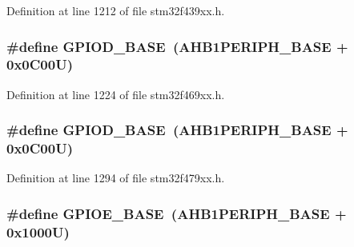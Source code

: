 Definition at line 1212 of file stm32f439xx.\+h.

\subsubsection[{\texorpdfstring{G\+P\+I\+O\+D\+\_\+\+B\+A\+SE}{GPIOD_BASE}}]{\setlength{\rightskip}{0pt plus 5cm}\#define G\+P\+I\+O\+D\+\_\+\+B\+A\+SE~({\bf A\+H\+B1\+P\+E\+R\+I\+P\+H\+\_\+\+B\+A\+SE} + 0x0\+C00\+U)}\hypertarget{group___peripheral__memory__map_ga1a93ab27129f04064089616910c296ec}{}\label{group___peripheral__memory__map_ga1a93ab27129f04064089616910c296ec}


Definition at line 1224 of file stm32f469xx.\+h.

\subsubsection[{\texorpdfstring{G\+P\+I\+O\+D\+\_\+\+B\+A\+SE}{GPIOD_BASE}}]{\setlength{\rightskip}{0pt plus 5cm}\#define G\+P\+I\+O\+D\+\_\+\+B\+A\+SE~({\bf A\+H\+B1\+P\+E\+R\+I\+P\+H\+\_\+\+B\+A\+SE} + 0x0\+C00\+U)}\hypertarget{group___peripheral__memory__map_ga1a93ab27129f04064089616910c296ec}{}\label{group___peripheral__memory__map_ga1a93ab27129f04064089616910c296ec}


Definition at line 1294 of file stm32f479xx.\+h.

\subsubsection[{\texorpdfstring{G\+P\+I\+O\+E\+\_\+\+B\+A\+SE}{GPIOE_BASE}}]{\setlength{\rightskip}{0pt plus 5cm}\#define G\+P\+I\+O\+E\+\_\+\+B\+A\+SE~({\bf A\+H\+B1\+P\+E\+R\+I\+P\+H\+\_\+\+B\+A\+SE} + 0x1000\+U)}\hypertarget{group___peripheral__memory__map_gab487b1983d936c4fee3e9e88b95aad9d}{}\label{group___peripheral__memory__map_gab487b1983d936c4fee3e9e88b95aad9d}


